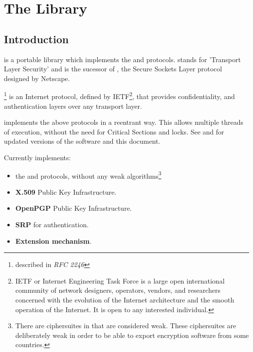 \documentclass{book}
\begin{document}



\tableofcontents
\newpage
{}
\pagestyle{fancy}

\chapter{The Library}
\section{Introduction}
\par
\gnutls{} is a portable library which implements the \tlsI{} and 
\sslIII{} protocols.
\tls{} stands for 'Transport Layer Security' and is the sucessor of \ssl{}, 
the Secure Sockets Layer protocol designed by Netscape. 

\tlsI{}\footnote{described in {\it RFC 2246}} is an Internet protocol,
defined by {IETF}\footnote{IETF or Internet Engineering Task Force 
is a large open international community of network
designers, operators, vendors, and researchers concerned with the evolution of 
the Internet architecture and the smooth operation of the Internet. It is open to any interested individual.}, 
that provides confidentiality, and authentication layers over any
transport layer.

\par
\gnutls{} implements the above
protocols in a reentrant way. This allows multiple threads of
execution, without the need for Critical Sections and locks. See
and  
for updated versions of the \gnutls{} software and this document.

\par
Currently \gnutls{} implements:
\begin{itemize}
 \item the \tlsI{} and \sslIII{} protocols, without any weak algorithms\footnote{
There are ciphersuites in \tlsI{} that are considered weak. These
ciphersuites are deliberately weak in order to be able to export encryption
software from some countries.}
 \item {\bf X.509} Public Key Infrastructure.
 \item {\bf OpenPGP} Public Key Infrastructure.
 \item {\bf SRP} for \tls{} authentication.
 \item \tls{} {\bf Extension mechanism}.
\end{itemize}
\end{document}
